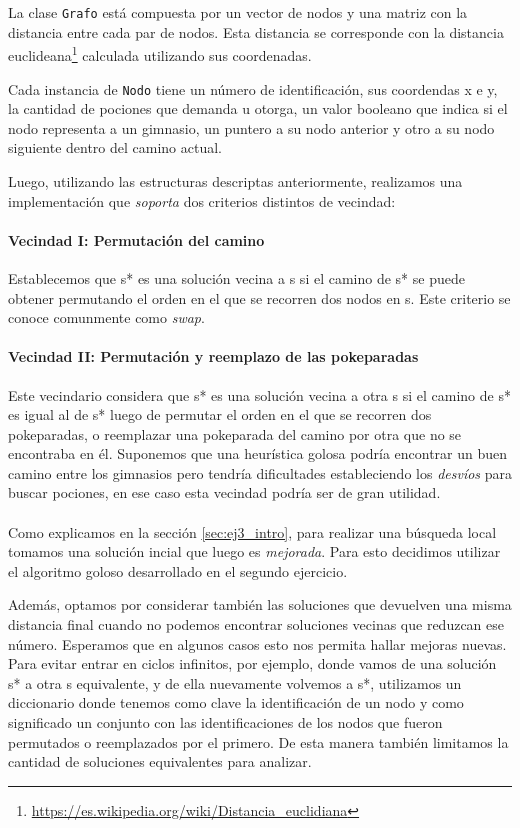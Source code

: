La clase \texttt{Grafo} est\'a compuesta por un vector de nodos y una matriz con la distancia entre cada par de nodos. Esta distancia se corresponde con la distancia euclideana\footnote{\url{https://es.wikipedia.org/wiki/Distancia_euclidiana}} calculada utilizando sus coordenadas.

Cada instancia de \texttt{Nodo} tiene un n\'umero de identificaci\'on, sus coordendas x e y, la cantidad de pociones que demanda u otorga, un valor booleano que indica si el nodo representa a un gimnasio, un puntero a su nodo anterior y otro a su nodo siguiente dentro del camino actual.

Luego, utilizando las estructuras descriptas anteriormente, realizamos una implementaci\'on que \textit{soporta} dos criterios distintos de vecindad:

\paragraph{Vecindad I: Permutaci\'on del camino}
Establecemos que s* es una soluci\'on vecina a s si el camino de s* se puede obtener permutando el orden en el que se recorren dos nodos en s. Este criterio se conoce comunmente como \textit{swap}.

\paragraph{Vecindad II: Permutaci\'on y reemplazo de las pokeparadas}
Este vecindario considera que s* es una soluci\'on vecina a otra s si el camino de s* es igual al de s* luego de permutar el orden en el que se recorren dos pokeparadas, o reemplazar una pokeparada del camino por otra que no se encontraba en \'el. Suponemos que una heur\'istica golosa podr\'ia encontrar un buen camino entre los gimnasios pero tendr\'ia dificultades estableciendo los \textit{desv\'ios} para buscar pociones, en ese caso esta vecindad podr\'ia ser de gran utilidad.

\paragraph{}
Como explicamos en la secci\'on \ref{sec:ej3_intro}, para realizar una b\'usqueda local tomamos una soluci\'on incial que luego es \textit{mejorada}. Para esto decidimos utilizar el algoritmo goloso desarrollado en el segundo ejercicio.

Adem\'as, optamos por considerar tambi\'en las soluciones que devuelven una misma distancia final cuando no podemos encontrar soluciones vecinas que reduzcan ese n\'umero. Esperamos que en algunos casos esto nos permita hallar mejoras nuevas. Para evitar entrar en ciclos infinitos, por ejemplo, donde vamos de una soluci\'on s* a otra s equivalente, y de ella nuevamente volvemos a s*, utilizamos un diccionario donde tenemos como clave la identificaci\'on de un nodo y como significado un conjunto con las identificaciones de los nodos que fueron permutados o reemplazados por el primero. De esta manera tambi\'en limitamos la cantidad de soluciones equivalentes para analizar.


